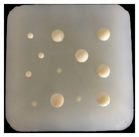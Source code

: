 \documentclass[]{interact}
\theoremstyle{plain}%
\theoremstyle{definition}
\theoremstyle{remark}
\begin{document}
\begin{figure}[]
\begin{subfigure}[b]{0.48\textwidth}
\begin{subfigure}[b]{.2\textwidth}
		\end{subfigure}
	\caption{}
	\label{phantom:1}
	\end{subfigure}
	\begin{subfigure}[b]{0.48\textwidth}
		\begin{subfigure}[b]{.7\textwidth}
			\includegraphics[width=\textwidth]{./figs/ph2.jpg}
		\end{subfigure} 
		\vspace{0.025\textwidth}
		\begin{subfigure}[b]{.2\textwidth}

\end{subfigure}
\end{subfigure}
\end{figure}
\end{document}
